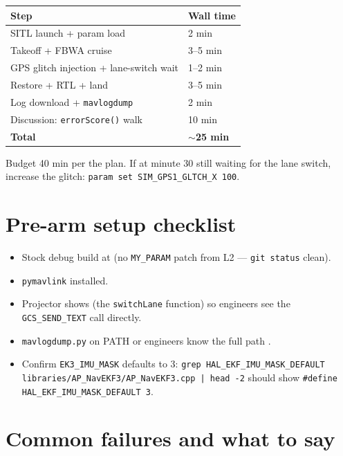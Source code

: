 \documentclass[a4paper,11pt,twoside]{article}
\begin{document}
\begin{center}\small
\begin{tabular}{|p{6cm}|p{4cm}|}\hline
\textbf{Step} & \textbf{Wall time} \\ \hline
SITL launch + param load & 2 min \\ \hline
Takeoff + FBWA cruise & 3--5 min \\ \hline
GPS glitch injection + lane-switch wait & 1--2 min \\ \hline
Restore + RTL + land & 3--5 min \\ \hline
Log download + \texttt{mavlogdump} & 2 min \\ \hline
Discussion: \texttt{errorScore()} walk & 10 min \\ \hline
\textbf{Total} & \textbf{$\sim$25 min} \\ \hline
\end{tabular}
\end{center}

Budget 40 min per the plan. If at minute 30 still waiting for the lane switch, increase the glitch: \texttt{param set SIM\_GPS1\_GLTCH\_X 100}.

\section*{Pre-arm setup checklist}

\begin{itemize}[label={[ ]}]
  \item Stock debug build at  (no \texttt{MY\_PARAM} patch from L2 --- \texttt{git status} clean).
  \item \texttt{pymavlink} installed.
  \item Projector shows  (the \texttt{switchLane} function) so engineers see the \texttt{GCS\_SEND\_TEXT} call directly.
  \item \texttt{mavlogdump.py} on PATH or engineers know the full path .
  \item Confirm \texttt{EK3\_IMU\_MASK} defaults to 3: \texttt{grep HAL\_EKF\_IMU\_MASK\_DEFAULT libraries/AP\_NavEKF3/AP\_NavEKF3.cpp | head -2} should show \texttt{\#define HAL\_EKF\_IMU\_MASK\_DEFAULT 3}.
\end{itemize}

\section*{Common failures and what to say}
\end{document}
